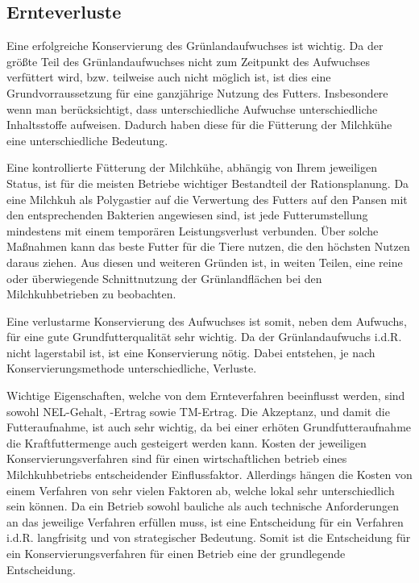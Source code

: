 \subsection{Ernteverluste}
\label{subsec:Lit:Ernte}

Eine erfolgreiche Konservierung des Grünlandaufwuchses ist wichtig.
Da der größte Teil des Grünlandaufwuchses nicht zum Zeitpunkt des Aufwuchses verfüttert wird, bzw. teilweise auch nicht möglich ist, ist dies eine Grundvorraussetzung für eine ganzjährige Nutzung des Futters.
Insbesondere wenn man berücksichtigt, dass unterschiedliche Aufwuchse unterschiedliche Inhaltsstoffe aufweisen.
Dadurch haben diese für die Fütterung der Milchkühe eine unterschiedliche Bedeutung.

Eine kontrollierte Fütterung der Milchkühe, abhängig von Ihrem jeweiligen Status, ist für die meisten Betriebe wichtiger Bestandteil der Rationsplanung.
Da eine Milchkuh als Polygastier auf die Verwertung des Futters auf den Pansen mit den entsprechenden Bakterien angewiesen sind, ist jede Futterumstellung mindestens mit einem temporären Leistungsverlust verbunden.
Über solche Maßnahmen kann das beste Futter für die Tiere nutzen, die den höchsten Nutzen daraus ziehen.
Aus diesen und weiteren Gründen ist, in weiten Teilen, eine reine oder überwiegende Schnittnutzung der Grünlandflächen bei den Milchkuhbetrieben zu beobachten.

Eine verlustarme Konservierung des Aufwuchses ist somit, neben dem Aufwuchs, für eine gute Grundfutterqualität sehr wichtig.
Da der Grünlandaufwuchs i.d.R. nicht lagerstabil ist, ist eine Konservierung nötig.
Dabei entstehen, je nach Konservierungsmethode unterschiedliche, Verluste.

Wichtige Eigenschaften, welche von dem Ernteverfahren beeinflusst werden, sind sowohl \ac{NEL}-Gehalt, -Ertrag sowie \ac{TM}-Ertrag.
Die Akzeptanz, und damit die Futteraufnahme, ist auch sehr wichtig, da bei einer erhöten Grundfutteraufnahme die Kraftfuttermenge auch gesteigert werden kann.
Kosten der jeweiligen Konservierungsverfahren sind für einen wirtschaftlichen betrieb eines Milchkuhbetriebs entscheidender Einflussfaktor.
Allerdings hängen die Kosten von einem Verfahren von sehr vielen Faktoren ab, welche lokal sehr unterschiedlich sein können.
Da ein Betrieb sowohl bauliche als auch technische Anforderungen an das jeweilige Verfahren erfüllen muss, ist eine Entscheidung für ein Verfahren i.d.R. langfrisitg und von strategischer Bedeutung.
Somit ist die Entscheidung für ein Konservierungsverfahren für einen Betrieb eine der grundlegende Entscheidung.

